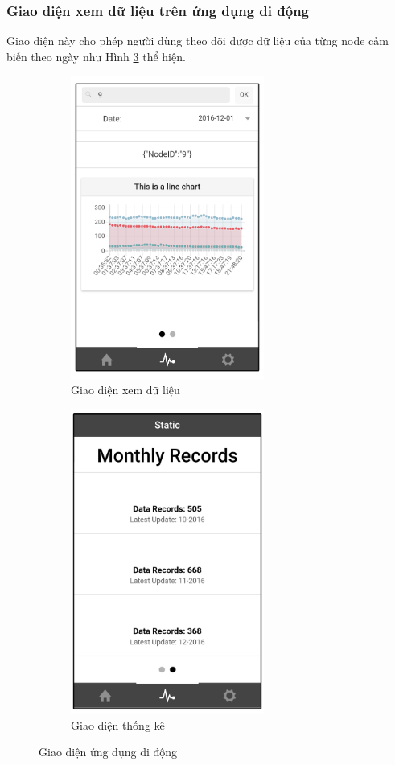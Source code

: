 \subsubsection*{Giao diện xem dữ liệu trên ứng dụng di động}
Giao diện này cho phép người dùng theo dõi được dữ liệu của từng node cảm biến theo ngày như Hình \ref{fig:giaodienchinh2} thể hiện.
\begin{figure}[H]
	\centering  
	\begin{subfigure}[b]{0.5\textwidth}
		\includegraphics[width=2.5in]{main_4}
		\caption[Giao diện xem dữ liệu]{Giao diện xem dữ liệu}
		\label{fig:main_4}
	\end{subfigure}\hfill
	\begin{subfigure}[b]{0.5\textwidth}
		\includegraphics[width=2.5in]{main_3}
		\caption[Giao diện thống kê]{Giao diện thống kê}
		\label{fig:main_3}
	\end{subfigure}
	\caption{Giao diện ứng dụng di động}
	\label{fig:giaodienchinh2}
\end{figure}
\newpage
